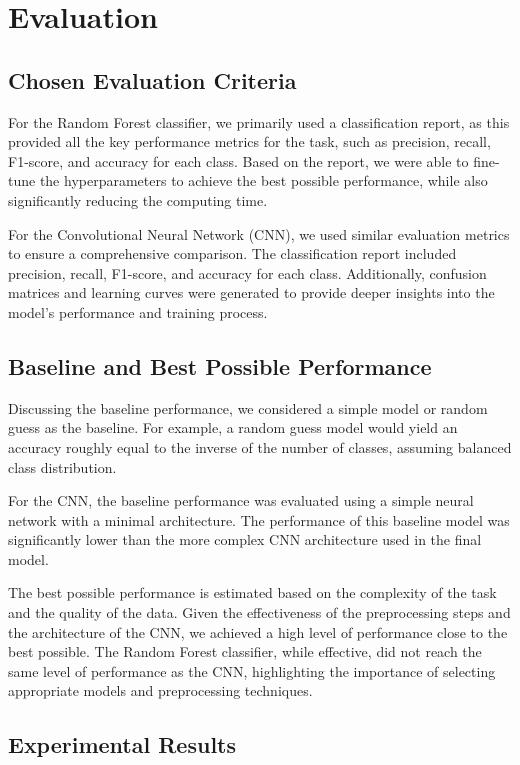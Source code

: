 \section{Evaluation}

\subsection{Chosen Evaluation Criteria}
For the Random Forest classifier, we primarily used a classification report, as this provided all the key performance metrics for the task, such as precision, recall, F1-score, and accuracy for each class. Based on the report, we were able to fine-tune the hyperparameters to achieve the best possible performance, while also significantly reducing the computing time.

For the Convolutional Neural Network (CNN), we used similar evaluation metrics to ensure a comprehensive comparison. The classification report included precision, recall, F1-score, and accuracy for each class. Additionally, confusion matrices and learning curves were generated to provide deeper insights into the model's performance and training process.

\subsection{Baseline and Best Possible Performance}
Discussing the baseline performance, we considered a simple model or random guess as the baseline. For example, a random guess model would yield an accuracy roughly equal to the inverse of the number of classes, assuming balanced class distribution.

For the CNN, the baseline performance was evaluated using a simple neural network with a minimal architecture. The performance of this baseline model was significantly lower than the more complex CNN architecture used in the final model.

The best possible performance is estimated based on the complexity of the task and the quality of the data. Given the effectiveness of the preprocessing steps and the architecture of the CNN, we achieved a high level of performance close to the best possible. The Random Forest classifier, while effective, did not reach the same level of performance as the CNN, highlighting the importance of selecting appropriate models and preprocessing techniques.

\subsection{Experimental Results}

